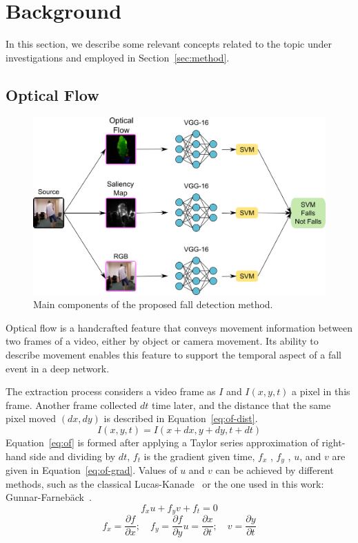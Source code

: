 \documentclass[conference]{IEEEtran}
\begin{document}
\section{Background}
\label{background}

In this section, we describe some relevant concepts related to the topic under investigations and employed in Section~\ref{sec:method}.

\subsection{Optical Flow}
\label{sec:opticalflow}

\begin{figure}[htbp]
\centerline{\includegraphics[width=0.57\linewidth]{figures/overview.png}}
\caption{Main components of the proposed fall detection method.}
\label{fig:overview}
\end{figure}
Optical flow is a handcrafted feature that conveys movement information between two frames of a video, either by object or camera movement. Its ability to describe movement enables this feature to support the temporal aspect of a fall event in a deep network.\par
The extraction process considers a video frame as $I$ and $I(x, y, t)$ a pixel in this frame. Another frame collected $dt$ time later, and the distance that the same pixel moved $(dx, dy)$ is described in Equation~\ref{eq:of-dist}.
\begin{equation}
\label{eq:of-dist}
I(x, y, t)=I(x+dx, y+dy, t+dt)
\end{equation}
Equation~\ref{eq:of} is formed after applying a Taylor series approximation of right-hand side and dividing by $dt$, $f_t$ is the gradient given time, $f_x$ , $f_y$ , $u$, and $v$ are given in Equation~\ref{eq:of-grad}. Values of $u$ and $v$ can be achieved by different methods, such as the classical Lucas-Kanade~\cite{jain2018abnormal} or the one used in this work: Gunnar-Farnebäck~\cite{lowhur2015dense}.
\begin{equation}
\label{eq:of}
f_xu + f_yv + f_t=0
\end{equation}
\begin{equation}
\label{eq:of-grad}
f_x = \frac{\partial f}{\partial x}; \quad f_y = \frac{\partial f}{\partial y}u = \frac{\partial x}{\partial t}; \quad v = \frac{\partial y}{\partial t}
\end{equation}
\end{document}

